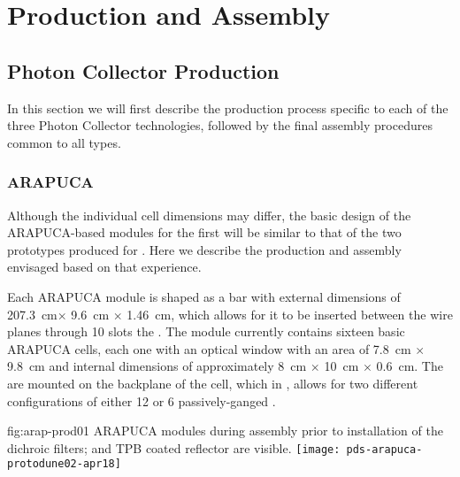 \section{Production and Assembly}
\label{sec:fdsp-pd-prod-assy}


\subsection{Photon Collector Production}
\label{sec:fdsp-pd-prod-pc}

In this section we will first describe the production process specific to each of the three Photon Collector technologies, followed by the final assembly procedures common to all types. 


\subsubsection{ARAPUCA}
\label{ssec:fdsp-pd-pc-prod-arapuca}
Although the individual cell dimensions may differ, the basic design of the ARAPUCA-based  modules for the first   will be similar to that of the two prototypes produced for . Here we describe the production and assembly envisaged based on that experience.

Each  ARAPUCA module is shaped as a bar with external dimensions of 
\SI{207.3}{cm}$ \times$ \SI{9.6}{cm} $\times$ \SI{1.46}{cm}, which allows for it to be inserted between the wire planes through 10 slots the . The module currently contains sixteen basic ARAPUCA cells, each one with an optical window with an area of \SI{7.8}{cm} $\times$ \SI{9.8}{cm} and internal dimensions of approximately \SI{8}{cm} $\times$ \SI{10}{cm} $\times$ \SI{0.6}{cm}. The  are mounted on the backplane of the cell, which in , allows for  two different configurations of either 12 or 6 passively-ganged .

\begin{dunefigure}{fig:arap-prod01}
{ ARAPUCA modules during assembly prior to installation of the dichroic filters;  and TPB coated reflector are visible.}
  \texttt{[image: pds-arapuca-protodune02-apr18]}
\end{dunefigure}

